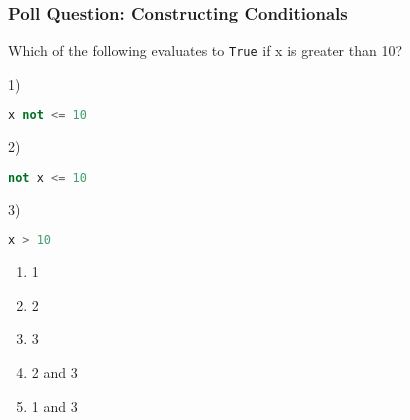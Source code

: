 \documentclass{beamer}
\begin{document}
%
%
\begin{frame}[fragile]
	\frametitle{Poll Question: Constructing Conditionals}
  Which of the following evaluates to \lstinline|True| if x is greater than 10?
	\begin{minipage}{0.69\textwidth}
    1)
		\begin{lstlisting}[language=Python, autogobble,basicstyle=\tiny,numbers=none]
    x not <= 10 
		\end{lstlisting}
    \vspace{1cm}
    2)
		\begin{lstlisting}[language=Python, autogobble,basicstyle=\tiny,numbers=none]
    not x <= 10
		\end{lstlisting}
    \vspace{1cm}
    3)
		\begin{lstlisting}[language=Python, autogobble,basicstyle=\tiny,numbers=none]
    x > 10
		\end{lstlisting}
	\end{minipage}
	\begin{minipage}{0.29\textwidth}
    \begin{enumerate}[A]
      \item 1
      \item 2
      \item 3
      \item 2 and 3
      \item 1 and 3
    \end{enumerate}
	\end{minipage}
\end{frame}
\end{document}
